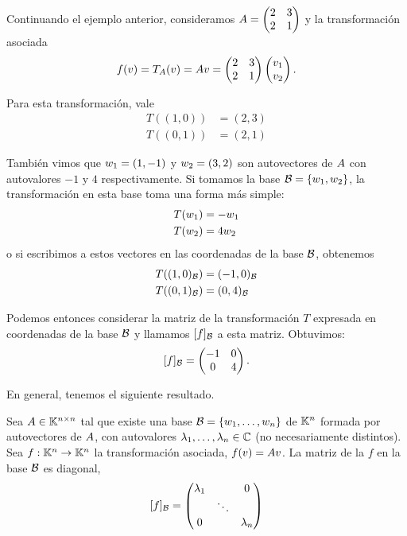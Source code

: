\begin{ejemplo} Continuando el ejemplo anterior, consideramos
$\Ab = \begin{pmatrix} 2 & 3 \\ 2 & 1 \end{pmatrix}$ y la transformación asociada
$$f(\vb) = T_{\Ab}(\vb) = \Ab \vb = \begin{pmatrix} 2 & 3 \\ 2 & 1 \end{pmatrix} \begin{pmatrix} v_1 \\ v_2 \end{pmatrix}.$$

Para esta transformación, vale
$$
\begin{aligned}
T((1,0)) &= (2, 3) \\
T((0,1)) &= (2, 1)
\end{aligned}
$$

También vimos que $\wb_1 = (1,-1)$ y $\wb_2 = (3,2)$ son autovectores de $\Ab$ con autovalores $-1$ y $4$ respectivamente.
Si tomamos la base $\B = \{\wb_1, \wb_2\}$, la transformación en esta base toma una forma más simple:
$$
\begin{aligned}
T(\wb_1) &= -\wb_1 \\
T(\wb_2) &= 4\wb_2
\end{aligned}
$$
o si escribimos a estos vectores en las coordenadas de la base $\mathcal B$, obtenemos
$$
\begin{aligned}
T((1,0)_\mathcal B) &= (-1,0)_\mathcal B \\
T((0,1)_\mathcal B) &= (0,4)_\mathcal B \\
\end{aligned}
$$

Podemos entonces considerar la matriz de la transformación $T$ expresada en coordenadas de la base $\mathcal B$ y llamamos $[f]_\mathcal B$ a esta matriz. Obtuvimos:
$$
[f]_\mathcal B = \begin{pmatrix} -1 & 0 \\ 0 & 4 \end{pmatrix}.
$$

\end{ejemplo}

En general, tenemos el siguiente resultado.

\begin{prop}
Sea $\Ab \in \Knn$ tal que existe una base $\B = \{\wb_1, \dots, \wb_n\}$ de $\mathbb K^{n}$ formada por autovectores de $\Ab$, con autovalores $\lambda_1, \dots, \lambda_n \in \mathbb C$ (no necesariamente distintos). Sea $f: \mathbb K^{n} \rightarrow \mathbb K^{n}$ la transformación asociada, $f(\vb) = \Ab \vb$. La matriz de la $f$ en la base $\mathcal B$ es diagonal,
$$
[f]_\mathcal B =
\begin{pmatrix} \lambda_1 & & 0 \\ & \ddots & \\ 0 & & \lambda_n \end{pmatrix}
$$

\end{prop}

